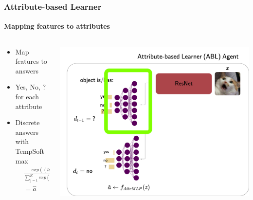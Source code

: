 \documentclass[9pt]{beamer}
\begin{document}
\begin{frame}
\frametitle{Attribute-based Learner}
\framesubtitle{Mapping features to attributes}
\begin{columns}[T]
\begin{column}{.5\textwidth}
	\begin{itemize}
		\item Map features to answers
		\item Yes, No, ? for each attribute
		\item Discrete answers with TempSoftmax
		\begin{align*}
		&\frac{exp((log\;\pi_i)/\tau)}{\sum_{j=1}^{K}exp((log\;\pi_j)/\tau)}\\
		& = \hat{a}
		\end{align*}
	\end{itemize}
\end{column}
\begin{column}{.5\textwidth}
	\includegraphics[width=\textwidth]{images/urdtc_parts_attrMLP.pdf}
\end{column}
\end{columns}
\end{frame}
\end{document}
